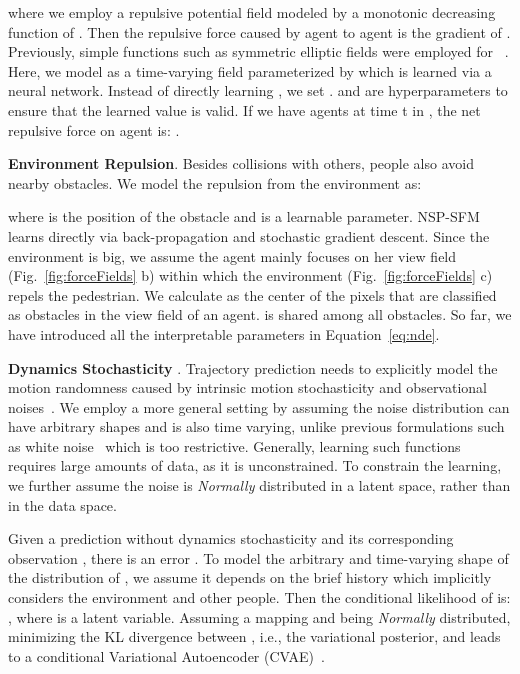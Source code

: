 \documentclass[runningheads]{llncs}
\newcommand{\figref}[1]{Fig.~\ref{fig:#1}}
\newcommand{\Eqnref}[1]{Equation~\ref{eq:#1}}
\begin{document}
where we employ a repulsive potential field  modeled by a monotonic decreasing function of . Then the repulsive force caused by agent  to agent  is the gradient of . Previously, simple functions such as symmetric elliptic fields were employed for ~\cite{helbing1995social}. Here, we model  as a time-varying field parameterized by 
which is learned via a neural network. Instead of directly learning , we set .  and  are hyperparameters to ensure that the learned  value is valid. If we have  agents at time t in , the net repulsive force on agent  is: .

\textbf{Environment Repulsion}. Besides collisions with others, people also avoid nearby obstacles. We model the repulsion from the environment as:

where  is the position of the obstacle and  is a learnable parameter. NSP-SFM learns  directly via back-propagation and stochastic gradient descent. Since the environment is big, we assume the agent mainly focuses on her view field (\figref{forceFields} b) within which the environment (\figref{forceFields} c) repels the pedestrian. We calculate  as the center of the pixels that are classified as obstacles in the view field of an agent.  is shared among all obstacles. So far, we have introduced all the interpretable parameters  in \Eqnref{nde}.

\textbf{Dynamics Stochasticity }. Trajectory prediction needs to explicitly model the motion randomness caused by intrinsic motion stochasticity and observational noises~\cite{wang_path_2016,wang_trending_2016}. We employ a more general setting by assuming the noise distribution can have arbitrary shapes and is also time varying, unlike previous formulations such as white noise~{\cite{He_Informative_2020}} which is too restrictive. Generally, learning such functions requires large amounts of data, as it is unconstrained. To constrain the learning, we further assume the noise is \textit{Normally} distributed in a latent space, rather than in the data space.

Given a prediction  without dynamics stochasticity and its corresponding observation , there is an error . To model the arbitrary and time-varying shape of the distribution of , we assume it depends on the brief history  which implicitly considers the environment and other people. Then the conditional likelihood of  is: , where  is a latent variable. Assuming a mapping  and  being \textit{Normally} distributed, minimizing the KL divergence between , i.e., the variational posterior, and  leads to a conditional Variational Autoencoder (CVAE)~\cite{sohn_learning_2015}.
\end{document}
